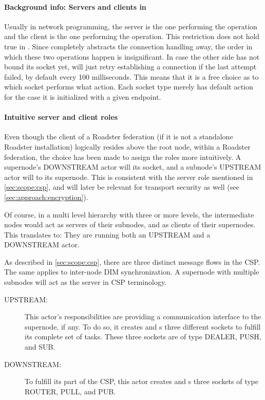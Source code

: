\paragraph{Background info: Servers and clients in \zmq}
Usually in network programming, the server is the one performing the
 operation and the client is the one performing the 
operation. This restriction does not hold true in \zmq. Since \zmq completely
abstracts the connection handling away, the order in which these two operations
happen is insignificant. In case the other side has not bound its socket
yet, \zmq will just retry establishing a connection if the last attempt failed,
by default every 100 milliseconds. This means that it is a free choice as to which socket
performs what action. Each socket type merely has default action for the case
it is initialized with a given endpoint.

\paragraph{Intuitive server and client roles}
Even though the client of a Roadster federation (if it is not a standalone
Roadster installation) logically resides above the root node, within a Roadster
federation, the choice has been made to assign the roles more intuitively. A
supernode's DOWNSTREAM actor will  its socket, and a subnode's
UPSTREAM actor will  to its supernode. This is consistent
with the server role mentioned in \autoref{sec:scope:csp}, and will later be
relevant for transport security as well (see \autoref{sec:approach:encryption}).

Of course, in a multi level hierarchy with three or more levels, the
intermediate nodes would act as servers of their subnodes, and as clients of
their supernodes. This translates to: They are running both an UPSTREAM and a DOWNSTREAM
actor.

As described in \autoref{sec:scope:csp}, there are three distinct message flows
in the \gls{CSP}. The same applies to inter-node DIM synchronization. A
supernode with multiple subnodes will act as the server in CSP terminology.

\begin{description}
	\item [UPSTREAM:]
		This actor's responsibilities are providing a
		communication interface to the supernode, if any. To do so, it
		creates and s three different sockets to fulfill
		its complete set of tasks. These three sockets are of type
		DEALER, PUSH, and SUB.

	\item [DOWNSTREAM:]
		To fulfill its part of the CSP, this actor creates
		and s three sockets of type ROUTER, PULL, and PUB.
\end{description}



